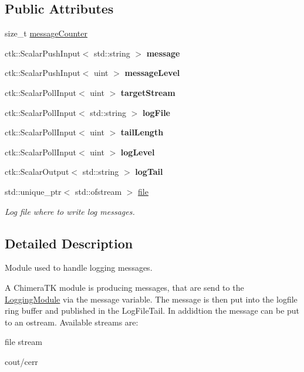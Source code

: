 \subsection*{Public Attributes}
\begin{DoxyCompactItemize}
\item 
size\+\_\+t \hyperlink{structLoggingModule_a30626e4224e872a8b8ea94f4b3df810f}{message\+Counter}
\item 
ctk\+::\+Scalar\+Push\+Input$<$ std\+::string $>$ {\bfseries message}
\item 
ctk\+::\+Scalar\+Push\+Input$<$ uint $>$ {\bfseries message\+Level}
\item 
ctk\+::\+Scalar\+Poll\+Input$<$ uint $>$ {\bfseries target\+Stream}
\item 
ctk\+::\+Scalar\+Poll\+Input$<$ std\+::string $>$ {\bfseries log\+File}
\item 
ctk\+::\+Scalar\+Poll\+Input$<$ uint $>$ {\bfseries tail\+Length}
\item 
ctk\+::\+Scalar\+Poll\+Input$<$ uint $>$ {\bfseries log\+Level}
\item 
ctk\+::\+Scalar\+Output$<$ std\+::string $>$ {\bfseries log\+Tail}
\item 
std\+::unique\+\_\+ptr$<$ std\+::ofstream $>$ \hyperlink{structLoggingModule_a600659a6a9219f9123ae1fd7b2f43826}{file}\hypertarget{structLoggingModule_a600659a6a9219f9123ae1fd7b2f43826}{}\label{structLoggingModule_a600659a6a9219f9123ae1fd7b2f43826}

\begin{DoxyCompactList}\small\item\em Log file where to write log messages. \end{DoxyCompactList}\end{DoxyCompactItemize}


\subsection{Detailed Description}
Module used to handle logging messages. 

A Chimera\+TK module is producing messages, that are send to the \hyperlink{structLoggingModule}{Logging\+Module} via the {\ttfamily message} variable. The message is then put into the logfile ring buffer and published in the {\ttfamily Log\+File\+Tail}. In addidtion the message can be put to an ostream. Available streams are\+:
\begin{DoxyItemize}
\item file stream
\item cout/cerr
\end{DoxyItemize}

